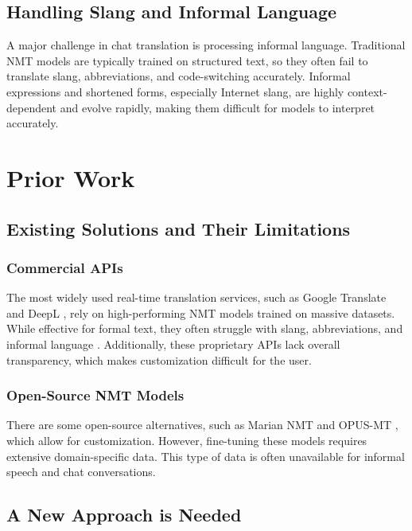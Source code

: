 \documentclass[10pt,twocolumn]{article}
\begin{document}
\subsection{Handling Slang and Informal Language}

A major challenge in chat translation is processing informal language. Traditional NMT models are typically trained on structured text, so they often fail to translate slang, abbreviations, and code-switching accurately. Informal expressions and shortened forms, especially Internet slang, are highly context-dependent and evolve rapidly, making them difficult for models to interpret accurately. 

\section{Prior Work}

\subsection{Existing Solutions and Their Limitations}

\subsubsection{Commercial APIs}

The most widely used real-time translation services, such as Google Translate \cite{WuGoogleTranslate2016} and DeepL \cite{DeepL}, rely on high-performing NMT models trained on massive datasets. While effective for formal text, they often struggle with slang, abbreviations, and informal language \cite{BaldwinNoisyText2013}. Additionally, these proprietary APIs lack overall transparency, which makes customization difficult for the user.

\subsubsection{Open-Source NMT Models}

There are some open-source alternatives, such as Marian NMT \cite{Junczys-DowmuntMarian2018} and OPUS-MT \cite{TiedemannOPUS2020}, which allow for customization. However, fine-tuning these models requires extensive domain-specific data. This type of data is often unavailable for informal speech and chat conversations.

\subsection{A New Approach is Needed}
\end{document}
